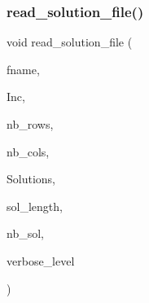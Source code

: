 \mbox{\label{util_8_c_aa19610d16546c01524a145fdb3f0daff}} 
\subsubsection{\texorpdfstring{read\+\_\+solution\+\_\+file()}{read\_solution\_file()}}
{\footnotesize\ttfamily void read\+\_\+solution\+\_\+file (\begin{DoxyParamCaption}\item[{\mbox{\hyperlink{galois_8h_ab6cc7b4aeb6ea31aba2b3fbfc83ff5e6}{B\+Y\+TE}} $\ast$}]{fname,  }\item[{\mbox{\hyperlink{galois_8h_a09fddde158a3a20bd2dcadb609de11dc}{I\+NT}} $\ast$}]{Inc,  }\item[{\mbox{\hyperlink{galois_8h_a09fddde158a3a20bd2dcadb609de11dc}{I\+NT}}}]{nb\+\_\+rows,  }\item[{\mbox{\hyperlink{galois_8h_a09fddde158a3a20bd2dcadb609de11dc}{I\+NT}}}]{nb\+\_\+cols,  }\item[{\mbox{\hyperlink{galois_8h_a09fddde158a3a20bd2dcadb609de11dc}{I\+NT}} $\ast$\&}]{Solutions,  }\item[{\mbox{\hyperlink{galois_8h_a09fddde158a3a20bd2dcadb609de11dc}{I\+NT}} \&}]{sol\+\_\+length,  }\item[{\mbox{\hyperlink{galois_8h_a09fddde158a3a20bd2dcadb609de11dc}{I\+NT}} \&}]{nb\+\_\+sol,  }\item[{\mbox{\hyperlink{galois_8h_a09fddde158a3a20bd2dcadb609de11dc}{I\+NT}}}]{verbose\+\_\+level }\end{DoxyParamCaption})}

\mbox{\label{util_8_c_a726805e3f54c37940c365598b47c26d6}} 
